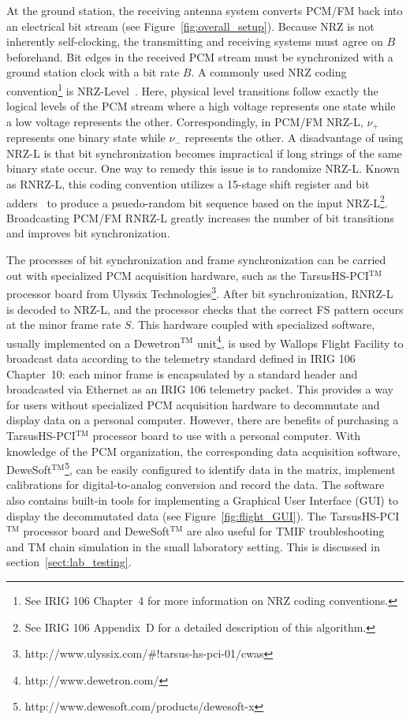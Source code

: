 \documentclass{ws-jai}
\begin{document}
At the ground station, the receiving antenna system converts PCM/FM  back into an electrical bit stream (see Figure~\ref{fig:overall_setup}). Because NRZ is not inherently self-clocking, the transmitting and receiving systems must agree on $B$ beforehand. Bit edges in the received PCM stream must be synchronized with a ground station clock with a bit rate $B$. A commonly used NRZ coding convention\footnote{See IRIG 106 Chapter~4 for more information on NRZ coding conventions.} is NRZ-Level~\cite[NRZ-L;][]{TMapp06}. Here, physical level transitions follow exactly the logical levels of the PCM stream where a high voltage represents one state while a low voltage represents the other. Correspondingly, in PCM/FM NRZ-L, $\nu_+$ represents one binary state while $\nu_-$ represents the other. A disadvantage of using NRZ-L is that bit synchronization becomes impractical if long strings of the same binary state occur. One way to remedy this issue is to randomize NRZ-L. Known as RNRZ-L, this coding convention utilizes a 15-stage shift register and bit adders~\cite{Horowitz89} to produce a psuedo-random bit sequence based on the input NRZ-L\footnote{See IRIG 106 Appendix~D for a detailed description of this algorithm.}. Broadcasting PCM/FM RNRZ-L greatly increases the number of bit transitions and improves bit synchronization. 

The processes of bit synchronization and frame synchronization can be carried out with specialized PCM acquisition hardware, such as the TarsusHS-PCI$^\text{TM}$ processor board from Ulyssix Technologies\footnote{http://www.ulyssix.com/\#!tarsus-hs-pci-01/cwas}. After bit synchronization, RNRZ-L is decoded to NRZ-L, and the processor checks that the correct FS pattern occurs at the minor frame rate $S$. This hardware coupled with specialized software, usually implemented on a Dewetron$^\text{TM}$ unit\footnote{http://www.dewetron.com/}, is used by Wallops Flight Facility to broadcast data according to the telemetry standard defined in IRIG 106 Chapter~10: each minor frame is encapsulated by a standard header and broadcasted via Ethernet as an IRIG 106 telemetry packet. This provides a way for users without specialized PCM acquisition hardware to decommutate and display data on a personal computer. However, there are benefits of purchasing a TarsusHS-PCI$^\text{TM}$ processor board to use with a personal computer. With knowledge of the PCM organization, the corresponding data acquisition software, DeweSoft$^\text{TM}$\footnote{http://www.dewesoft.com/products/dewesoft-x}, can be easily configured to identify data in the matrix, implement calibrations for digital-to-analog conversion and record the data. The software also contains built-in tools for implementing a Graphical User Interface (GUI) to display the decommutated data (see Figure~\ref{fig:flight_GUI}). The TarsusHS-PCI$^\text{TM}$ processor board and DeweSoft$^\text{TM}$ are also useful for TMIF troubleshooting and TM chain simulation in the small laboratory setting. This is discussed in section~\ref{sect:lab_testing}. 
\end{document}
